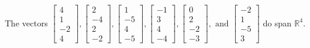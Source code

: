 \begin{exercise}
\begin{exerciseStatement}
  \end{exerciseStatement}
  \begin{exerciseAnswer}
   The vectors \(\left[\begin{array}{r}
4 \\
1 \\
-2 \\
4
\end{array}\right] , \left[\begin{array}{r}
2 \\
-4 \\
2 \\
-2
\end{array}\right] , \left[\begin{array}{r}
1 \\
-5 \\
4 \\
-5
\end{array}\right] , \left[\begin{array}{r}
-1 \\
3 \\
4 \\
-4
\end{array}\right] , \left[\begin{array}{r}
0 \\
2 \\
-2 \\
-3
\end{array}\right] , \text{ and } \left[\begin{array}{r}
-2 \\
1 \\
-5 \\
3
\end{array}\right]\) 
  	 do  
	span \(\mathbb{R}^4\).
  


  \end{exerciseAnswer}
\end{exercise}